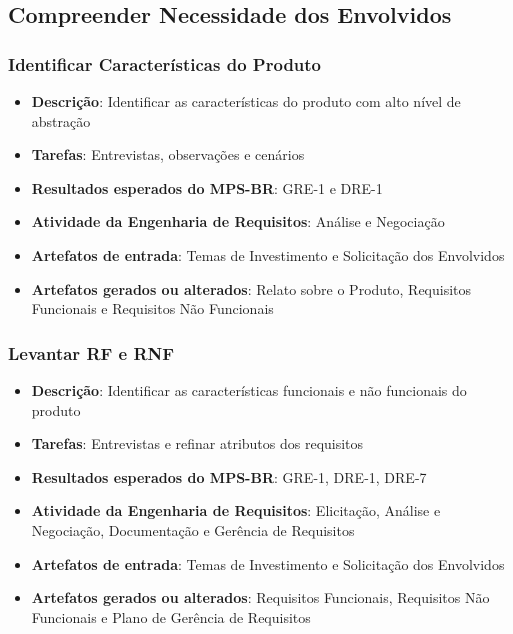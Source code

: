 \subsection{Compreender Necessidade dos Envolvidos}

\subsubsection{Identificar Características do Produto}

\begin{itemize}
\item \textbf{Descrição}: Identificar as características do produto com alto nível de abstração
\item \textbf{Tarefas}: Entrevistas, observações e cenários
\item \textbf{Resultados esperados do MPS-BR}: GRE-1 e DRE-1
\item \textbf{Atividade da Engenharia de Requisitos}: Análise e Negociação
\item \textbf{Artefatos de entrada}: Temas de Investimento e Solicitação dos Envolvidos
\item \textbf{Artefatos gerados ou alterados}: Relato sobre o Produto, Requisitos Funcionais e Requisitos Não Funcionais
\end{itemize}

\subsubsection{Levantar RF e RNF}

\begin{itemize}
\item \textbf{Descrição}: Identificar as características funcionais e não funcionais do produto
\item \textbf{Tarefas}: Entrevistas e refinar atributos dos requisitos
\item \textbf{Resultados esperados do MPS-BR}: GRE-1, DRE-1, DRE-7
\item \textbf{Atividade da Engenharia de Requisitos}:  Elicitação, Análise e Negociação, Documentação e Gerência de Requisitos
\item \textbf{Artefatos de entrada}: Temas de Investimento e Solicitação dos Envolvidos
\item \textbf{Artefatos gerados ou alterados}: Requisitos Funcionais, Requisitos Não Funcionais e Plano de Gerência de Requisitos
\end{itemize}

